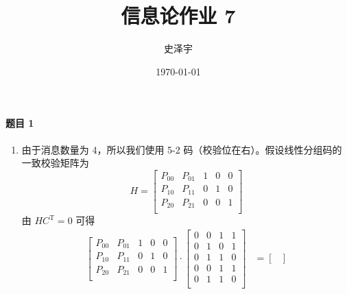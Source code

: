 \documentclass{ctexart}
\title{信息论作业 7}
\author{史泽宇}
\date{\today}
\begin{document}
\maketitle

\paragraph{题目 1}

\begin{enumerate}
    \item 由于消息数量为 4，所以我们使用 5-2 码（校验位在右）。假设线性分组码的一致校验矩阵为
    \begin{equation}
        H = \begin{bmatrix}
            P_{00} & P_{01} & 1 & 0 & 0 \\
            P_{10} & P_{11} & 0 & 1 & 0 \\
            P_{20} & P_{21} & 0 & 0 & 1 \\
        \end{bmatrix}
    \end{equation}
    由 $HC^\mathrm{T} = 0$ 可得
    \begin{align}
        \begin{bmatrix}
            P_{00} & P_{01} & 1 & 0 & 0 \\
            P_{10} & P_{11} & 0 & 1 & 0 \\
            P_{20} & P_{21} & 0 & 0 & 1 \\
        \end{bmatrix}
        \cdot
        \begin{bmatrix}
            0 & 0 & 1 & 1 \\
            0 & 1 & 0 & 1 \\
            0 & 1 & 1 & 0 \\
            0 & 0 & 1 & 1 \\
            0 & 1 & 1 & 0 \\
        \end{bmatrix}
        &=
        \begin{bmatrix}

\end{bmatrix}
\end{align}
\end{enumerate}
\end{document}
